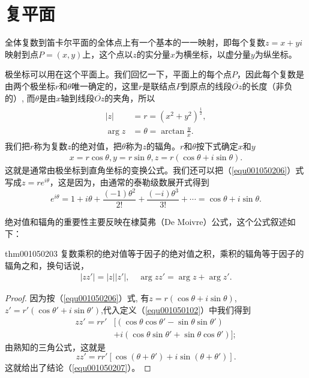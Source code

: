 \section{复平面}\label{section0010502}
全体复数到笛卡尔平面的全体点上有一个基本的一一映射，即每个复数$z=x+yi$映射到点$P=(x, y)$上，这个点以$z$的实分量$x$为横坐标，以虚分量$y$为纵坐标。

极坐标可以用在这个平面上。我们回忆一下，平面上的每个点$P$，因此每个复数是由两个极坐标$r$和$\theta$唯一确定的，这里$r$是联结点$P$到原点的线段$\overline{Oz}$的长度（非负的）, 而$\theta$是由$x$轴到线段$\overline{Oz}$的夹角，所以
\begin{gather}\label{equ001050205}
\begin{aligned}
|z| &= r = (x^2+y^2)^{\frac{1}{2}},\\
\arg{z} &= \theta = \arctan{\frac{y}{x}}.
\end{aligned}
\end{gather}
我们把$r$称为复数$z$的绝对值，把$\theta$称为$z$的辐角。$r$和$\theta$按下式确定$x$和$y$
\begin{gather}\label{equ001050206}
x = r\cos{\theta}, y = r\sin{\theta}, z = r(\cos{\theta} + i\sin{\theta}).
\end{gather}
这就是通常由极坐标到直角坐标的变换公式。我们还可以把（\ref{equ001050206}）式写成$z=re^{i\theta}$，这是因为，由通常的泰勒级数展开式得到
\[
e^{i\theta} = 1 + i\theta + \frac{(-1)\theta^2}{2!} + \frac{(-i)\theta^3}{3!} + \cdots = \cos{\theta} + i\sin{\theta}.
\]

绝对值和辐角的重要性主要反映在棣莫弗（De Moivre）公式，这个公式叙述如下：
\begin{theorem}{}{thm001050203}
复数乘积的绝对值等于因子的绝对值之积，乘积的辐角等于因子的辐角之和，换句话说，
\begin{gather}\label{equ001050207}
|zz'| = |z||z'|,\quad \arg{zz'} = \arg{z} + \arg{z'}.
\end{gather}
\end{theorem}

\begin{proof}
因为按（\ref{equ001050206}）式, 有$z = r(\cos{\theta} + i\sin{\theta})$, $z' = r'(\cos{\theta'} + i\sin{\theta'})$,代入定义（\ref{equ001050102}）中我们得到
\[
\begin{aligned}
zz' = rr'&[(\cos{\theta}\cos{\theta'} - \sin{\theta}\sin{\theta'}) \\
&+i(\cos{\theta}\sin{\theta'} + \sin{\theta}\cos{\theta'})];
\end{aligned}
\]
由熟知的三角公式，这就是
\[
zz' = rr'[\cos{(\theta + \theta')} + i\sin{(\theta + \theta')}].
\]
这就给出了结论（\ref{equ001050207}）。
\end{proof}

